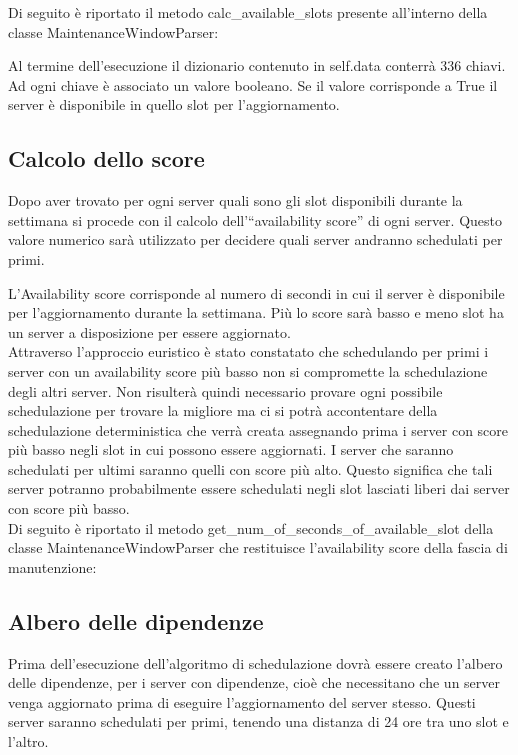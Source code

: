 Di seguito è riportato il metodo calc\_available\_slots presente all'interno della classe MaintenanceWindowParser:



Al termine dell’esecuzione il dizionario contenuto in self.data conterrà 336 chiavi. 
Ad ogni chiave è associato un valore booleano. Se il valore corrisponde a True il 
server è disponibile in quello slot per l’aggiornamento.


\subsection{Calcolo dello score}
Dopo aver trovato per ogni server quali sono gli slot disponibili durante la 
settimana si procede con il calcolo dell’“availability score” di ogni server. 
Questo valore numerico sarà utilizzato per decidere quali server andranno schedulati per primi.

L'Availability score corrisponde al numero di secondi in cui il server è disponibile 
per l’aggiornamento durante la settimana.
Più lo score sarà basso e meno slot ha un server a disposizione per essere aggiornato.\\

Attraverso l’approccio euristico è stato constatato che schedulando per primi i 
server con un availability score più basso non si compromette la schedulazione degli 
altri server. Non risulterà quindi necessario provare ogni possibile schedulazione 
per trovare la migliore ma ci si potrà accontentare della schedulazione deterministica 
che verrà creata assegnando prima i server con score più basso negli slot in cui 
possono essere aggiornati.
I server che saranno schedulati per ultimi saranno quelli con score più alto.
Questo significa che tali server potranno probabilmente essere schedulati 
negli slot lasciati liberi dai server con score più basso.\\


Di seguito è riportato il metodo get\_num\_of\_seconds\_of\_available\_slot della 
classe MaintenanceWindowParser che restituisce l'availability score della fascia di manutenzione:




\subsection{Albero delle dipendenze}
Prima dell’esecuzione dell’algoritmo di schedulazione dovrà essere creato 
l’albero delle dipendenze, per i server con dipendenze, cioè che necessitano 
che un server venga aggiornato prima di eseguire l’aggiornamento del server 
stesso. Questi server saranno schedulati per primi, tenendo una distanza di 24 
ore tra uno slot e l’altro.

